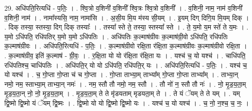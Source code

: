 \documentclass[17pt]{extarticle}
\begin{document}
29. अधि॑पति॒रित्यधि॑ - प॒तिः॒ । . श्वि॒त्रो व॒शिनी॑ व॒शिनी᳚ श्वि॒त्रः श्वि॒त्रो व॒शिनी᳚ । . व॒शिनी॒ नाम॒ नाम॑ व॒शिनी॑ व॒शिनी॒ नाम॑ । . नामा᳚स्यसि॒ नाम॒ नामा॑सि । . अ॒सी॒य मि॒य म॑स्य सी॒यम् । . इ॒यम् दिग् दिगि॒य मि॒यम् दिक् । . दिक् तस्या॒ स्तस्या॒ दिग् दिक् तस्याः᳚ । . तस्या᳚ स्ते ते॒ तस्या॒ स्तस्या᳚ स्ते । . ते॒ य॒मो य॒म स्ते॑ ते य॒मः । . य॒मो ऽधि॑पति॒ रधि॑पतिर् य॒मो य॒मो ऽधि॑पतिः । . अधि॑पतिः क॒ल्माष॑ग्रीवः क॒ल्माष॑ग्री॒वो ऽधि॑पति॒ रधि॑पतिः क॒ल्माष॑ग्रीवः । . अधि॑पति॒रित्यधि॑ - प॒तिः॒ । . क॒ल्माष॑ग्रीवो रक्षि॒ता र॑क्षि॒ता क॒ल्माष॑ग्रीवः क॒ल्माष॑ग्रीवो रक्षि॒ता । . क॒ल्माष॑ग्रीव॒ इति॑ क॒ल्माष॑ - ग्री॒वः॒ । . र॒क्षि॒ता यो यो र॑क्षि॒ता र॑क्षि॒ता यः । . यश्च॑ च॒ यो यश्च॑ । . चाधि॑पति॒ रधि॑पतिश्च॒ चाधि॑पतिः । . अधि॑पति॒र् यो यो ऽधि॑पति॒ रधि॑पति॒र् यः । . अधि॑पति॒रित्यधि॑ - प॒तिः॒ । . यश्च॑ च॒ यो यश्च॑ । . च॒ गो॒प्ता गो॒प्ता च॑ च गो॒प्ता । . गो॒प्ता ताभ्या॒म् ताभ्या᳚म् गो॒प्ता गो॒प्ता ताभ्या᳚म् । . ताभ्या॒न् नमो॒ नम॒ स्ताभ्या॒म् ताभ्या॒न् नमः॑ । . नम॒ स्तौ तौ नमो॒ नम॒ स्तौ । . तौ नो॑ न॒ स्तौ तौ नः॑ । . नो॒ मृ॒ड॒य॒ता॒म् मृ॒ड॒य॒ता॒न् नो॒ नो॒ मृ॒ड॒य॒ता॒म् । . मृ॒ड॒य॒ता॒म् ते ते मृ॑डयताम् मृडयता॒म् ते । . ते यं ॅयम् ते ते यम् । . यम् द्वि॒ष्मो द्वि॒ष्मो यं ॅयम् द्वि॒ष्मः । . द्वि॒ष्मो यो यो द्वि॒ष्मो द्वि॒ष्मो यः । . यश्च॑ च॒ यो यश्च॑ । . च॒ नो॒ न॒श्च॒ च॒ नः॒ । \newline
\end{document}
